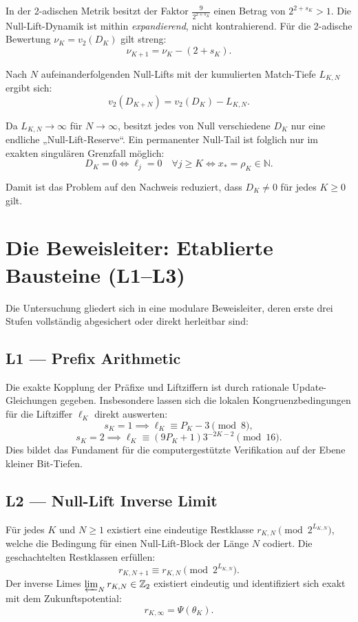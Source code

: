 \documentclass[11pt,a4paper]{article}
\begin{document}
In der 2-adischen Metrik besitzt der Faktor $\frac{9}{2^{2+s_K}}$ einen Betrag von $2^{2+s_K} > 1$. Die Null-Lift-Dynamik ist mithin \emph{expandierend}, nicht kontrahierend. Für die 2-adische Bewertung $\nu_K = v_2(D_K)$ gilt streng:
$$\nu_{K+1} = \nu_K - (2 + s_K).$$

Nach $N$ aufeinanderfolgenden Null-Lifts mit der kumulierten Match-Tiefe $L_{K,N}$ ergibt sich:
$$v_2(D_{K+N}) = v_2(D_K) - L_{K,N}.$$

Da $L_{K,N} \to \infty$ für $N \to \infty$, besitzt jedes von Null verschiedene $D_K$ nur eine endliche „Null-Lift-Reserve“. Ein permanenter Null-Tail ist folglich nur im exakten singulären Grenzfall möglich:
$$\boxed{D_K = 0 \iff \ell_j = 0 \quad \forall j \ge K \iff x_* = \rho_K \in \mathbb{N}.}$$

Damit ist das Problem auf den Nachweis reduziert, dass $D_K \neq 0$ für jedes $K \ge 0$ gilt.

\section{Die Beweisleiter: Etablierte Bausteine (L1--L3)}

Die Untersuchung gliedert sich in eine modulare Beweisleiter, deren erste drei Stufen vollständig abgesichert oder direkt herleitbar sind:

\subsection*{L1 --- Prefix Arithmetic}
Die exakte Kopplung der Präfixe und Liftziffern ist durch rationale Update-Gleichungen gegeben. Insbesondere lassen sich die lokalen Kongruenzbedingungen für die Liftziffer $\ell_K$ direkt auswerten:
$$s_K = 1 \implies \ell_K \equiv P_K - 3 \pmod 8,$$
$$s_K = 2 \implies \ell_K \equiv (9P_K + 1)3^{-2K-2} \pmod{16}.$$
Dies bildet das Fundament für die computergestützte Verifikation auf der Ebene kleiner Bit-Tiefen.

\subsection*{L2 --- Null-Lift Inverse Limit}
Für jedes $K$ und $N \ge 1$ existiert eine eindeutige Restklasse $r_{K,N} \pmod{2^{L_{K,N}}}$, welche die Bedingung für einen Null-Lift-Block der Länge $N$ codiert. Die geschachtelten Restklassen erfüllen:
$$r_{K,N+1} \equiv r_{K,N} \pmod{2^{L_{K,N}}}.$$
Der inverse Limes $\varprojlim_N r_{K,N} \in \mathbb{Z}_2$ existiert eindeutig und identifiziert sich exakt mit dem Zukunftspotential:
$$\boxed{r_{K,\infty} = \Psi(\theta_K).}$$
\end{document}
